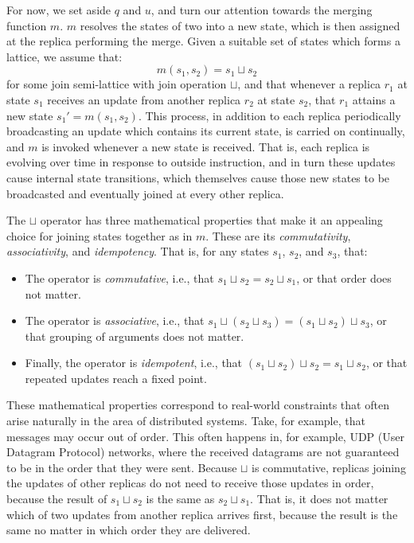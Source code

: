 For now, we set aside $q$ and $u$, and turn our attention towards the merging
function $m$. $m$ resolves the states of two \CRDTs into a new state, which is
then assigned at the replica performing the merge. Given a suitable set of
states which forms a lattice, we assume that:
\[
  m(s_1, s_2) = s_1 \sqcup s_2
\]
for some join semi-lattice with join operation $\sqcup$, and that whenever a
\CRDT replica $r_1$ at state $s_1$ receives an update from another replica
$r_2$ at state $s_2$, that $r_1$ attains a new state $s_1' = m(s_1, s_2)$.
This process, in addition to each replica periodically broadcasting an update
which contains its current state, is carried on continually, and $m$ is
invoked whenever a new state is received. That is, each replica is evolving
over time in response to outside instruction, and in turn these updates cause
internal state transitions, which themselves cause those new states to be
broadcasted and eventually joined at every other replica.

The $\sqcup$ operator has three mathematical properties that make it an
appealing choice for joining states together as in $m$. These are its
\emph{commutativity}, \emph{associativity}, and \emph{idempotency}. That is, for
any states $s_1$, $s_2$, and $s_3$, that:
\begin{itemize}
  \item The operator is \emph{commutative}, i.e., that $s_1 \sqcup s_2 = s_2
    \sqcup s_1$, or that order does not matter.
  \item The operator is \emph{associative}, i.e., that $s_1 \sqcup (s_2 \sqcup
    s_3) = (s_1 \sqcup s_2) \sqcup s_3$, or that grouping of arguments does not
    matter.
  \item Finally, the operator is \emph{idempotent}, i.e., that $(s_1 \sqcup s_2)
    \sqcup s_2 = s_1 \sqcup s_2$, or that repeated updates reach a fixed point.
\end{itemize}

These mathematical properties correspond to real-world constraints that often
arise naturally in the area of distributed systems. Take, for example, that
messages may occur out of order. This often happens in, for example, UDP (User
Datagram Protocol) networks, where the received datagrams are not guaranteed to
be in the order that they were sent. Because $\sqcup$ is commutative, replicas
joining the updates of other replicas do not need to receive those updates in
order, because the result of $s_1 \sqcup s_2$ is the same as $s_2 \sqcup s_1$.
That is, it does not matter which of two updates from another replica arrives
first, because the result is the same no matter in which order they are
delivered.

